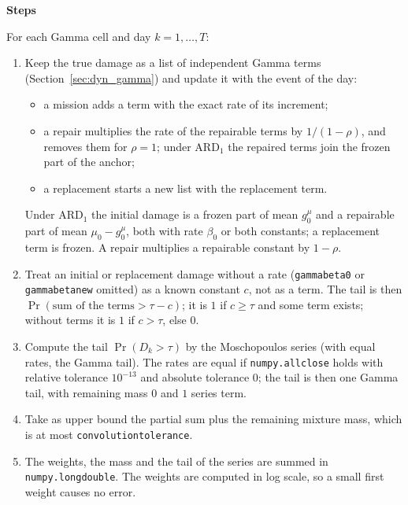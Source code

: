 \documentclass[11pt,a4paper]{article}
\theoremstyle{plain}
\theoremstyle{definition}
\newcommand{\ARDone}{\mathrm{ARD}_{1}}
\newcommand{\blockhead}[1]{\par\noindent\textbf{#1}\par\nobreak}
\renewcommand{\_}{\textunderscore\allowbreak{}}
\begin{document}
\blockhead{Steps}
For each Gamma cell and day $k = 1,\ldots,T$:
\begin{enumerate}[nosep,label=\arabic*.]
  \item Keep the true damage as a list of independent Gamma terms (Section~\ref{sec:dyn_gamma}) and update it with the event of the day:
  \begin{itemize}[nosep]
    \item a mission adds a term with the exact rate of its increment;
    \item a repair multiplies the rate of the repairable terms by $1/(1-\rho)$, and removes them for $\rho = 1$; under $\ARDone$ the repaired terms join the frozen part of the anchor;
    \item a replacement starts a new list with the replacement term.
  \end{itemize}
  Under $\ARDone$ the initial damage is a frozen part of mean $g^{\mu}_0$ and a repairable part of mean $\mu_0 - g^{\mu}_0$, both with rate $\beta_0$ or both constants; a replacement term is frozen. A repair multiplies a repairable constant by $1 - \rho$.
  \item Treat an initial or replacement damage without a rate (\texttt{gamma\_beta\_0} or \texttt{gamma\_beta\_new} omitted) as a known constant $c$, not as a term. The tail is then $\Pr(\text{sum of the terms} > \tau - c)$; it is $1$ if $c \ge \tau$ and some term exists; without terms it is $1$ if $c > \tau$, else $0$.
  \item Compute the tail $\Pr(D_k > \tau)$ by the Moschopoulos series (with equal rates, the Gamma tail). The rates are equal if \texttt{numpy.allclose} holds with relative tolerance $10^{-13}$ and absolute tolerance $0$; the tail is then one Gamma tail, with remaining mass $0$ and $1$ series term.
  \item Take as upper bound the partial sum plus the remaining mixture mass, which is at most \texttt{convolution\_tolerance}.
  \item The weights, the mass and the tail of the series are summed in \texttt{numpy.longdouble}. The weights are computed in log scale, so a small first weight causes no error.
\end{enumerate}
\end{document}
